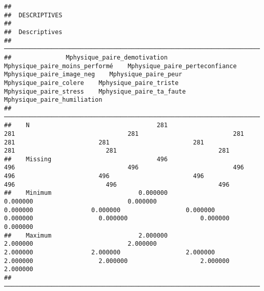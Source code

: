\documentclass[
]{article}
\begin{document}
\begin{verbatim}
## 
##  DESCRIPTIVES
## 
##  Descriptives                                                                                                                                                                                                                                                                                                  
##  ───────────────────────────────────────────────────────────────────────────────────────────────────────────────────────────────────────────────────────────────────────────────────────────────────────────────────────────────────────────────────────────────────────────────────────────────────────────── 
##               Mphysique_paire_demotivation    Mphysique_paire_moins_performé    Mphysique_paire_perteconfiance    Mphysique_paire_image_neg    Mphysique_paire_peur    Mphysique_paire_colere    Mphysique_paire_triste    Mphysique_paire_stress    Mphysique_paire_ta_faute    Mphysique_paire_humiliation   
##  ───────────────────────────────────────────────────────────────────────────────────────────────────────────────────────────────────────────────────────────────────────────────────────────────────────────────────────────────────────────────────────────────────────────────────────────────────────────── 
##    N                                   281                               281                               281                          281                     281                       281                       281                       281                         281                            281   
##    Missing                             496                               496                               496                          496                     496                       496                       496                       496                         496                            496   
##    Minimum                        0.000000                          0.000000                          0.000000                     0.000000                0.000000                  0.000000                  0.000000                  0.000000                    0.000000                       0.000000   
##    Maximum                        2.000000                          2.000000                          2.000000                     2.000000                2.000000                  2.000000                  2.000000                  2.000000                    2.000000                       2.000000   
##  ─────────────────────────────────────────────────────────────────────────────────────────────────────────────────────────────────────────────────────────────────────────────────────────────────────────────────────────────────────────────────────────────────────────────────────────────────────────────
\end{verbatim}
\end{document}
